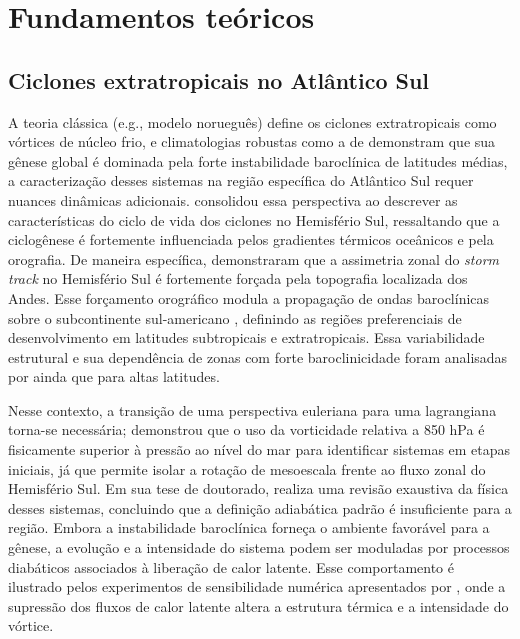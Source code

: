 \chapter{Fundamentos teóricos}\label{ch:theoretical_background}


\section{Ciclones extratropicais no Atlântico Sul}\label{sec:tb_fundamentos}
A teoria clássica (e.g., modelo norueguês) define os ciclones extratropicais como vórtices de núcleo frio, e climatologias robustas como a de \citet{hoskins2005new} demonstram que sua gênese global é dominada pela forte instabilidade baroclínica de latitudes médias, a caracterização desses sistemas na região específica do Atlântico Sul requer nuances dinâmicas adicionais. \citet{sinclair1995climatology} consolidou essa perspectiva ao descrever as características do ciclo de vida dos ciclones no Hemisfério Sul, ressaltando que a ciclogênese é fortemente influenciada pelos gradientes térmicos oceânicos e pela orografia. De maneira específica, \citet{inatsu2004zonal} demonstraram que a assimetria zonal do \textit{storm track} no Hemisfério Sul é fortemente forçada pela topografia localizada dos Andes. Esse forçamento orográfico modula a propagação de ondas baroclínicas sobre o subcontinente sul-americano \citep{vera2002cold}, definindo as regiões preferenciais de desenvolvimento em latitudes subtropicais e extratropicais. Essa variabilidade estrutural e sua dependência de zonas com forte baroclinicidade foram analisadas por \citet{simmonds1999southern} ainda que para altas latitudes.

Nesse contexto, a transição de uma perspectiva euleriana para uma lagrangiana torna-se necessária; \citet{sinclair1994objective} demonstrou que o uso da vorticidade relativa a 850 hPa é fisicamente superior à pressão ao nível do mar para identificar sistemas em etapas iniciais, já que permite isolar a rotação de mesoescala frente ao fluxo zonal do Hemisfério Sul. Em sua tese de doutorado, \citet{coutodesouza2024thesis} realiza uma revisão exaustiva da física desses sistemas, concluindo que a definição adiabática padrão é insuficiente para a região. Embora a instabilidade baroclínica forneça o ambiente favorável para a gênese, a evolução e a intensidade do sistema podem ser moduladas por processos diabáticos associados à liberação de calor latente. Esse comportamento é ilustrado pelos experimentos de sensibilidade numérica apresentados por \citet{reboita2022from}, onde a supressão dos fluxos de calor latente altera a estrutura térmica e a intensidade do vórtice.

